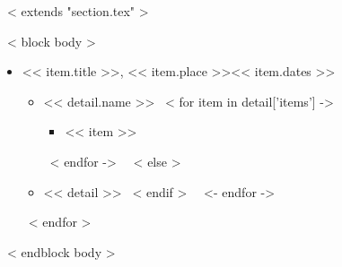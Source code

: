 ~< extends "section.tex" >~

~< block body >~
  \begin{itemize}
    ~< for item in items >~
      \item << item.title >>, << item.place >>\hfill << item.dates >>
      \begin{itemize}
        ~< for detail in item.details ->~
          ~< if detail.name >~
            \item << detail.name >> 
            ~< for item in detail['items'] ->~
              \begin{itemize}
                \item << item >>
              \end{itemize}
            ~< endfor ->~
          ~< else >~
            \item << detail >> 
          ~< endif >~
        ~<- endfor ->~
      \end{itemize}
    ~< endfor >~
  \end{itemize}
~< endblock body >~
